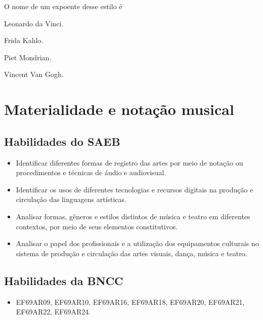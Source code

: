 O nome de um expoente desse estilo é

\begin{escolha}
\item Leonardo da Vinci.

\item Frida Kahlo.

\item Piet Mondrian.

\item Vincent Van Gogh.
\end{escolha}


\chapter{Materialidade e notação musical}

\section{Habilidades do SAEB}

\begin{itemize}
\item Identificar diferentes formas de registro das artes por meio de
notação ou procedimentos e técnicas de áudio e audiovisual.

\item Identificar os usos de diferentes tecnologias e recursos digitais na
produção e circulação das linguagens artísticas.

\item Analisar formas, gêneros e estilos distintos de música e teatro em
diferentes contextos, por meio de seus elementos constitutivos.

\item Analisar o papel dos profissionais e a utilização dos equipamentos
culturais no sistema de produção e circulação das artes visuais, dança,
música e teatro.
\end{itemize}

\section*{Habilidades da BNCC}

\begin{itemize}
  \item EF69AR09, EF69AR10, EF69AR16, EF69AR18, EF69AR20, EF69AR21, EF69AR22, EF69AR24.
\end{itemize}

